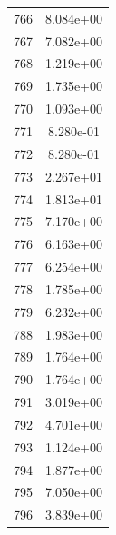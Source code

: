 \documentclass[12pt]{article}
\begin{document}
\begin{longtable}{@{}cc@{}}
766 & 8.084e+00 \\
767 & 7.082e+00 \\
768 & 1.219e+00 \\
769 & 1.735e+00 \\
770 & 1.093e+00 \\
771 & 8.280e-01 \\
772 & 8.280e-01 \\
773 & 2.267e+01 \\
774 & 1.813e+01 \\
775 & 7.170e+00 \\
776 & 6.163e+00 \\
777 & 6.254e+00 \\
778 & 1.785e+00 \\
779 & 6.232e+00 \\
788 & 1.983e+00 \\
789 & 1.764e+00 \\
790 & 1.764e+00 \\
791 & 3.019e+00 \\
792 & 4.701e+00 \\
793 & 1.124e+00 \\
794 & 1.877e+00 \\
795 & 7.050e+00 \\
796 & 3.839e+00 \\

\bottomrule
\end{longtable}
\end{document}
